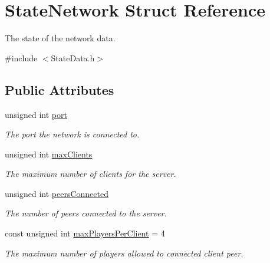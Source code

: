 \hypertarget{struct_state_network}{\section{State\-Network Struct Reference}
\label{struct_state_network}
}


The state of the network data.  




{\ttfamily \#include $<$State\-Data.\-h$>$}

\subsection*{Public Attributes}
\begin{DoxyCompactItemize}
\item 
\hypertarget{struct_state_network_a369a4768473db59ccbd4ba509a61595c}{unsigned int \hyperlink{struct_state_network_a369a4768473db59ccbd4ba509a61595c}{port}}\label{struct_state_network_a369a4768473db59ccbd4ba509a61595c}

\begin{DoxyCompactList}\small\item\em The port the network is connected to. \end{DoxyCompactList}\item 
\hypertarget{struct_state_network_a441e11a6962b2ef0f9456c937a1abbb6}{unsigned int \hyperlink{struct_state_network_a441e11a6962b2ef0f9456c937a1abbb6}{max\-Clients}}\label{struct_state_network_a441e11a6962b2ef0f9456c937a1abbb6}

\begin{DoxyCompactList}\small\item\em The maximum number of clients for the server. \end{DoxyCompactList}\item 
\hypertarget{struct_state_network_acad16df2ea00513fd70701fbfa90e329}{unsigned int \hyperlink{struct_state_network_acad16df2ea00513fd70701fbfa90e329}{peers\-Connected}}\label{struct_state_network_acad16df2ea00513fd70701fbfa90e329}

\begin{DoxyCompactList}\small\item\em The number of peers connected to the server. \end{DoxyCompactList}\item 
\hypertarget{struct_state_network_a49f4dd1dc1c43b2962da4dff48101003}{const unsigned int \hyperlink{struct_state_network_a49f4dd1dc1c43b2962da4dff48101003}{max\-Players\-Per\-Client} = 4}\label{struct_state_network_a49f4dd1dc1c43b2962da4dff48101003}

\begin{DoxyCompactList}\small\item\em The maximum number of players allowed to connected client peer. \end{DoxyCompactList}\end{DoxyCompactItemize}


